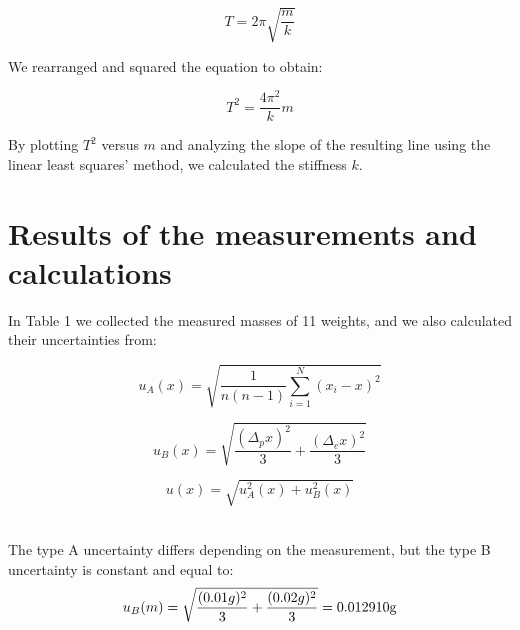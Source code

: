 \documentclass[a4paper,12pt,titlepage,bibliography=numbered]{article}
\begin{document}
\begin{equation}
    T = 2 \pi \sqrt{\frac{m}{k}}
\end{equation}

\noindent We rearranged and squared the equation to obtain:

\begin{equation}
    T^2 = \frac{4 \pi^2}{k}m
    \label{T_squered}
\end{equation}

\noindent By plotting $T^2$ versus $m$ and analyzing the slope of the resulting line using the linear least squares’ method, we calculated the stiffness $k$.

\section{Results of the measurements and calculations}

In Table 1 we collected the measured masses of 11 weights, and we also calculated their uncertainties from:

\begin{equation}
    u_A(x) = \sqrt{\frac{1}{n(n-1)}\sum_{i=1}^N(x_i-x)^2}
    \label{mass_uncertainty_A}
\end{equation}

\begin{equation}
    u_B(x) = \sqrt{\frac{(\Delta_p x)^2}{3} + \frac{(\Delta_e x)^2}{3}}
    \label{mass_uncertainty_B}
\end{equation}

\begin{equation}
    u(x) = \sqrt{u_A^2(x) + u_B^2(x)}
    \label{mass_uncertainty}
\end{equation}

\noindent \\The type A uncertainty differs depending on the measurement, but the type B uncertainty is constant and equal to: \\

\begin{equation}
    u_B(m) = \sqrt{\frac{(0.01 g)^2}{3} + \frac{(0.02 g)^2}{3}} = 0.012910 \mathrm{g} \\
\end{equation}
\end{document}
